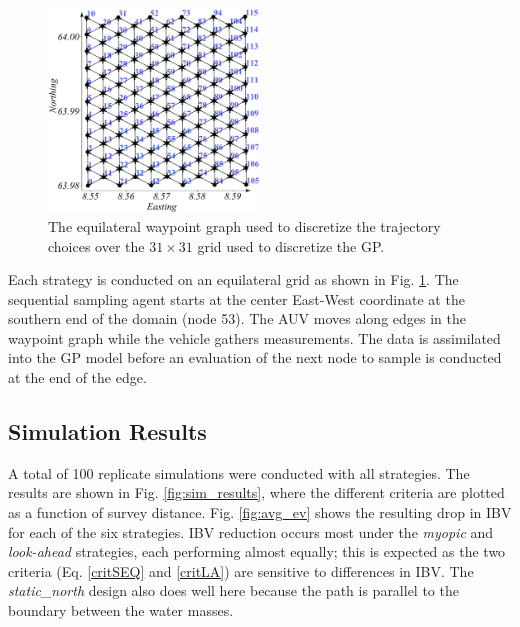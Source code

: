 \documentclass[aoas]{imsart}
\begin{document}
\begin{figure}[h!]
\centering
\includegraphics[width=0.50\textwidth]{Figures/sim/wp_graph_paper.pdf}
\caption{The equilateral waypoint graph used to discretize the
  trajectory choices over the $31\times31$ grid used to discretize the GP.}
\label{fig:wp_graph}
\end{figure}

Each strategy is conducted on an equilateral grid as shown in
Fig. \ref{fig:wp_graph}. The sequential sampling agent starts at the
center East-West coordinate at the southern end of the domain (node
53). The AUV moves along edges in the waypoint graph while the vehicle
gathers measurements. The data is assimilated into the GP model before
an evaluation of the next node to sample is conducted at the end of
the edge. 

\subsection{Simulation Results}

A total of 100 replicate simulations were conducted with all
strategies. The results are shown in Fig. \ref{fig:sim_results}, where
the different criteria are plotted as a function of survey
distance. Fig. \ref{fig:avg_ev} shows the resulting drop in IBV for
each of the six strategies. IBV reduction occurs most under the
\textit{myopic} and \textit{look-ahead} strategies, each performing
almost equally; this is expected as the two criteria
(Eq. \eqref{critSEQ} and \eqref{critLA}) are sensitive to differences
in IBV. The \textit{static\_north} design also does well here because
the path is parallel to the boundary between the water masses.
\end{document}
